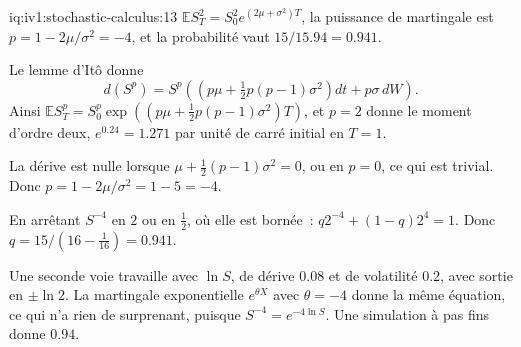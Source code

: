 \begin{solution}{iq:iv1:stochastic-calculus:13}
$\mathbb{E}S_T^2 = S_0^2e^{(2\mu + \sigma^2)T}$, la puissance de martingale est $p = 1 - 2\mu/\sigma^2 = -4$, et la probabilité vaut $15/15.94 = 0.941$.

Le lemme d'Itô donne
\[
d(S^p) = S^p\left(\left(p\mu + \tfrac12p(p - 1)\sigma^2\right)dt + p\sigma\,dW\right).
\]
Ainsi $\mathbb{E}S_T^p = S_0^p\exp((p\mu + \frac12p(p - 1)\sigma^2)T)$, et $p = 2$ donne le moment d'ordre deux, $e^{0.24} = 1.271$ par unité de carré initial en $T = 1$.

La dérive est nulle lorsque $\mu + \frac12(p - 1)\sigma^2 = 0$, ou en $p = 0$, ce qui est trivial. Donc $p = 1 - 2\mu/\sigma^2 = 1 - 5 = -4$.

En arrêtant $S^{-4}$ en $2$ ou en $\frac12$, où elle est bornée~: $q2^{-4} + (1 - q)2^4 = 1$. Donc $q = 15/(16 - \frac{1}{16}) = 0.941$.

Une seconde voie travaille avec $\ln S$, de dérive $0.08$ et de volatilité $0.2$, avec sortie en $\pm\ln 2$. La martingale exponentielle $e^{\theta X}$ avec $\theta = -4$ donne la même équation, ce qui n'a rien de surprenant, puisque $S^{-4} = e^{-4\ln S}$. Une simulation à pas fins donne $0.94$.



\end{solution}

